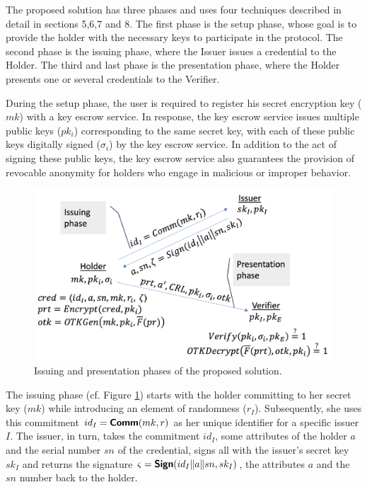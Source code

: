 The proposed solution has three phases and uses four techniques described in detail in sections 5,6,7 and 8. The first phase is the setup phase, whose goal is to provide the holder with the necessary keys to participate in the protocol. The second phase is the issuing phase, where the Issuer issues a credential to the Holder. The third and last phase is the presentation phase, where the Holder presents one or several credentials to the Verifier.

During the setup phase, the user is required to register his secret encryption key ($mk$) with a key escrow service. In response, the key escrow service issues multiple public keys ($pk_i$) corresponding to the same secret key, with each of these public keys digitally signed ($\sigma_i$) by the key escrow service. In addition to the act of signing these public keys, the key escrow service also guarantees the provision of revocable anonymity for holders who engage in malicious or improper behavior.

\begin{figure}
\includegraphics[width=\columnwidth]{schema.png}
\caption{Issuing and presentation phases of the proposed solution.}
\label{fig:schema}
\end{figure}

The issuing phase (cf. Figure \ref{fig:schema}) starts with the holder committing to her secret key ($mk$) while introducing an element of randomness ($r_I$). Subsequently, she uses this commitment $id_I=\textsf{\textbf{Comm}}(mk,r)$ as her unique identifier for a specific issuer $I$. The issuer, in turn, takes the commitment $id_I$, some attributes of the holder $a$ and the serial number $sn$ of the credential, signs all with the issuer's secret key $sk_I$ and returns the signature $\varsigma=\textsf{\textbf{Sign}}(id_I\|a\|sn,sk_I)$, the attributes $a$ and the $sn$ number back to the holder.

